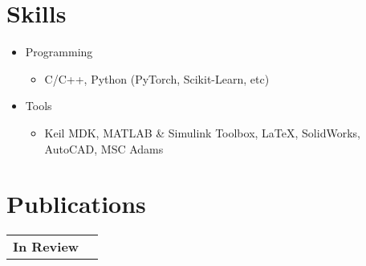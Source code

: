 \documentclass[letter,12pt]{article}
\begin{document}



\section{Skills}
\begin{itemize}[nosep,after=\strut, leftmargin=1em, itemsep=3pt]
    \item{Programming}
    \begin{itemize}
        \item C/C++, Python (PyTorch, Scikit-Learn, etc) 
    \end{itemize}
    \item{Tools}
    \begin{itemize}
        \item Keil MDK, MATLAB \& Simulink Toolbox, LaTeX, SolidWorks, AutoCAD, MSC Adams 
    \end{itemize}
\end{itemize}



\section{Publications}

\begin{tabularx}{\linewidth}{@{}l X@{}}
    \large \textbf{In Review} & \hfill {}\\
\end{tabularx}

\begin{refsection}
\nocite{*}
\printbibliography[heading=none]
\end{refsection}
\end{document}
